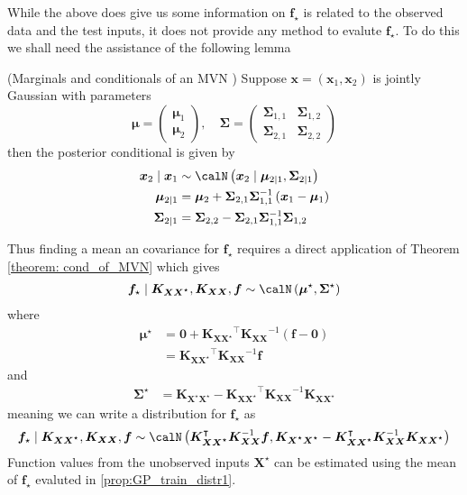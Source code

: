 While the above does give us some information on $\bm{f}_{\star}$ is related to the observed data and the test inputs, it does not provide any method to evalute $\bm{f}_{\star}$. To do this we shall need the assistance of the following lemma
\begin{thm}\label{theorem: cond_of_MVN}
    (Marginals and conditionals of an MVN \cite{MurphyKevinP2012Ml}) Suppose $\bm{x} = (\bm{x}_1, \bm{x}_2)$ is jointly Gaussian with parameters
    \[
        \bm{\mu} =
        \begin{pmatrix}
            \bm{\mu}_1 \\
            \bm{\mu}_2
        \end{pmatrix}, \quad
        \bm{\Sigma} =
        \begin{pmatrix}
            \bm{\Sigma}_{1,1} & \bm{\Sigma}_{1,2} \\
            \bm{\Sigma}_{2,1} & \bm{\Sigma}_{2,2}
        \end{pmatrix}
    \]
    then the posterior conditional is given by
    \begin{align*}
        \bm{x}_2 \mid \bm{x}_1 & \sim \calN \left( \bm{x}_2 \mid \bm{\mu}_{2 \mid 1}, \bm{\Sigma}_{2 \mid 1} \right)          \\
        \bm{\mu}_{2 \mid 1}    & = \bm{\mu}_2 + \bm{\Sigma}_{2,1} \bm{\Sigma}_{1,1}^{-1} \left( \bm{x}_1 - \bm{\mu}_1 \right) \\
        \bm{\Sigma}_{2 \mid 1} & = \bm{\Sigma}_{2,2} - \bm{\Sigma}_{2,1} \bm{\Sigma}_{1,1}^{-1} \bm{\Sigma}_{1,2}
    \end{align*}
\end{thm}

Thus finding a mean an covariance for $\bm{f}_{\star}$ requires a direct application of Theorem \ref{theorem: cond_of_MVN} which gives
\begin{align*}
    \bm{f}_{\star} \mid \bm{K_{XX^{\star}}} , \bm{K_{XX}}, \bm{f} \sim \calN \left( \bm{\mu}^{\star}, \bm{\Sigma}^{\star} \right)
\end{align*}
where
\begin{align*}
    \bm{\mu}^{\star} & = \bm{0} + \bm{K_{XX^{\star}}}^{\intercal} \bm{K_{XX}}^{-1} \left( \bm{f} - \bm{0} \right) \\
                     & = \bm{K_{XX^{\star}}}^{\intercal} \bm{K_{XX}}^{-1} \bm{f}
\end{align*}
and
\begin{align*}
    \bm{\Sigma}^{\star} & = \bm{K_{X^{\star}X^{\star}}} - \bm{K_{XX^{\star}}}^{\intercal} \bm{K_{XX}}^{-1} \bm{K_{XX^{\star}}}
\end{align*}
meaning we can write a distribution for $\bm{f}_{\star}$ as
\begin{equation}\label{prop:GP_train_distr1}
    \bm{f}_{\star} \mid \bm{K_{XX^{\star}}} , \bm{K_{XX}}, \bm{f} \sim \calN \left( \bm{K_{XX^{\star}}}^{\intercal} \bm{K_{XX}}^{-1} \bm{f},  \bm{K_{X^{\star}X^{\star}}} - \bm{K_{XX^{\star}}}^{\intercal} \bm{K_{XX}}^{-1} \bm{K_{XX^{\star}}}  \right)
\end{equation}
Function values from the unobserved inputs $\bm{X^{\star}}$ can be estimated using the mean of $\bm{f}_{\star}$ evaluted in \ref{prop:GP_train_distr1}.

